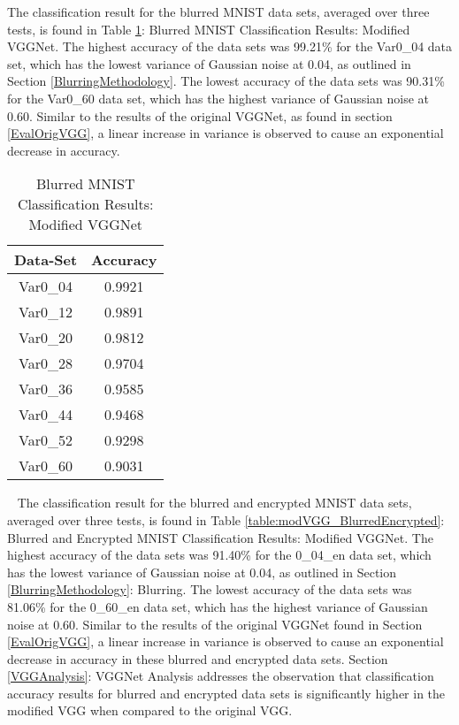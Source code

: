 \documentclass[12pt, titlepage]{article}
\begin{document}
\noindent The classification result for the blurred MNIST data sets, averaged over three tests, is found in Table \ref{table:modVGG_Blurred}: Blurred MNIST Classification Results: Modified VGGNet. The highest accuracy of the data sets was 99.21\% for the Var0\_04 data set, which has the lowest variance of Gaussian noise at 0.04, as outlined in Section \ref{BlurringMethodology}. The lowest accuracy of the data sets was 90.31\% for the Var0\_60 data set, which has the highest variance of Gaussian noise at 0.60. Similar to the results of the original VGGNet, as found in section \ref{EvalOrigVGG}, a linear increase in variance is observed to cause an exponential decrease in accuracy.

\begin{table}[!h]
	\begin{center}
		\begin{tabular}{| c | c |}
			\hline
			\textbf{Data-Set} & \textbf{Accuracy}\\
			\hline
			Var0\_04 & 0.9921\\
			\hline
			Var0\_12 & 0.9891\\
			\hline
			Var0\_20 & 0.9812\\
			\hline
			Var0\_28 & 0.9704\\
			\hline
			Var0\_36 & 0.9585\\
			\hline
			Var0\_44 & 0.9468\\
			\hline
			Var0\_52 & 0.9298\\
			\hline
			Var0\_60 & 0.9031\\
			\hline
		\end{tabular}
		\caption{Blurred MNIST Classification Results: Modified VGGNet}
		\label{table:modVGG_Blurred}
	\end{center}
\end{table}

~\newpage
\noindent The classification result for the blurred and encrypted MNIST data sets, averaged over three tests, is found in Table \ref{table:modVGG_BlurredEncrypted}: Blurred and Encrypted MNIST Classification Results: Modified VGGNet. The highest accuracy of the data sets was 91.40\% for the 0\_04\_en data set, which has the lowest variance of Gaussian noise at 0.04, as outlined in Section \ref{BlurringMethodology}: Blurring. The lowest accuracy of the data sets was 81.06\% for the 0\_60\_en data set, which has the highest variance of Gaussian noise at 0.60. Similar to the results of the original VGGNet found in Section \ref{EvalOrigVGG}, a linear increase in variance is observed to cause an exponential decrease in accuracy in these blurred and encrypted data sets. Section \ref{VGGAnalysis}: VGGNet Analysis addresses the observation that classification accuracy results for blurred and encrypted data sets is significantly higher in the modified VGG when compared to the original VGG.\\ 
\end{document}
